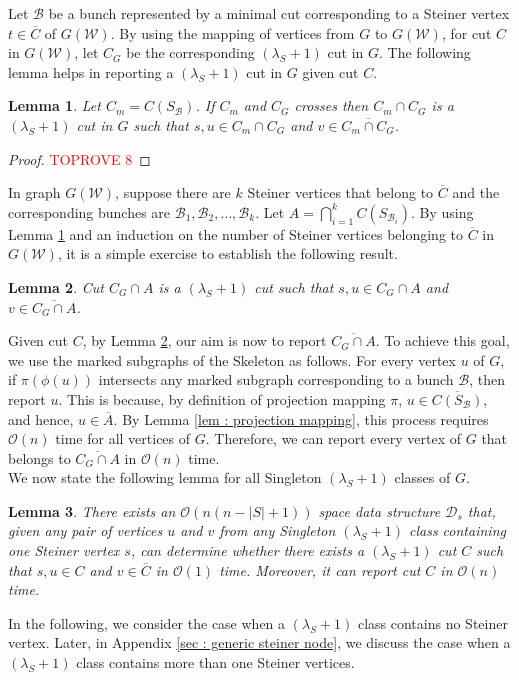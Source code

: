 \documentclass[letterpaper,11pt]{article}
\newtheorem{lemma}{Lemma}[]
\begin{document}
Let ${\mathcal B}$ be a bunch represented by a minimal cut corresponding to a Steiner vertex $t\in \overline{C}$ of $G({\mathcal W})$. By using the mapping of vertices from $G$ to $G({\mathcal W})$, for cut $C$ in $G({\mathcal W})$, let $C_G$ be the corresponding $(\lambda_S+1)$ cut in $G$. The following lemma helps in reporting a $(\lambda_S+1)$ cut in $G$ given cut $C$.
\begin{lemma} \label{lem : intersection is also a desired cut}
    Let $C_m=C(S_{\mathcal B})$. If $C_m$ and $C_G$ crosses then $C_m\cap C_G$ is a $(\lambda_S+1)$ cut in $G$ such that $s,u\in C_m\cap C_G$ and $v\in \overline{C_m\cap C_G}$.
\end{lemma}
\begin{proof}\textcolor{red}{TOPROVE 8}\end{proof}
In graph $G({\mathcal W})$, suppose there are $k$ Steiner vertices that belong to $\overline{C}$ and the corresponding bunches are ${\mathcal B}_1,{\mathcal B}_2,\ldots, {\mathcal B}_k$. Let $A=\bigcap_{i=1}^k C(S_{{\mathcal B}_i})$. By using Lemma \ref{lem : intersection is also a desired cut} and an induction on the number of Steiner vertices belonging to $\overline{C}$ in $G({\mathcal W})$, it is a simple exercise to establish the following result.
\begin{lemma} \label{lem : reporting desired cut}
    Cut $C_G\cap A$ is a $(\lambda_S+1)$ cut such that $s,u\in C_G\cap A$ and $v\in \overline{C_G\cap A}$.
\end{lemma}
Given cut $C$, by Lemma \ref{lem : reporting desired cut}, our aim is now to report $\overline{C_G\cap A}$. To achieve this goal, we use the marked subgraphs of the Skeleton as follows. For every vertex $u$ of $G$, if $\pi(\phi(u))$ intersects any marked subgraph corresponding to a bunch ${\mathcal B}$, then report $u$. This is because, by definition of projection mapping $\pi$, $u\in \overline{C(S_{\mathcal B})}$, and hence, $u\in \overline{A}$. By Lemma \ref{lem : projection mapping}, this process requires ${\mathcal O}(n)$ time for all vertices of $G$. Therefore, we can report every vertex of $G$ that belongs to $\overline{C_G\cap A}$ in ${\mathcal O}(n)$ time. \\



We now state the following lemma for all Singleton $(\lambda_S+1)$ classes of $G$.
\begin{lemma} \label{lem : data structure for singleton class}
    There exists an ${\mathcal O}(n(n-|S|+1))$ space data structure ${\mathcal D}_s$ that, given any pair of vertices $u$ and $v$ from any Singleton $(\lambda_S+1)$ class containing one Steiner vertex $s$, can determine whether there exists a $(\lambda_S+1)$ cut $C$ such that $s,u\in C$ and $v\in \overline{C}$ in ${\mathcal O}(1)$ time. Moreover, it can report cut $C$ in ${\mathcal O}(n)$ time.
\end{lemma}
In the following, we consider the case when a $(\lambda_S+1)$ class contains no Steiner vertex. Later, in Appendix \ref{sec : generic steiner node}, we discuss the case when a $(\lambda_S+1)$ class contains more than one Steiner vertices.
\end{document}
